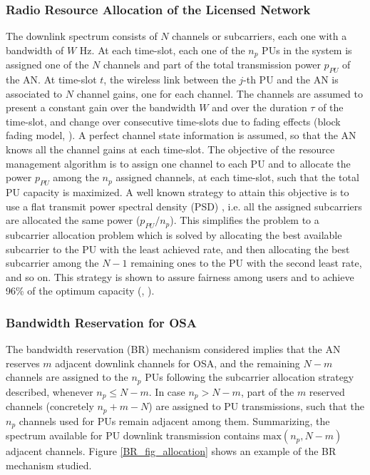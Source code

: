 \subsubsection{Radio Resource Allocation of the Licensed Network} 
The downlink spectrum consists of $N$ channels or subcarriers, each one with a bandwidth of $W$ Hz. At each time-slot, each one of the $n_{p}$ PUs in the system is assigned one of the $N$ channels and part of the total transmission power $p_{PU}$ of the AN.
At time-slot $t$, the wireless link between the $j$-th PU and the AN is associated to $N$ channel gains, one for each channel. The channels are assumed to present a constant gain over the bandwidth $W$ and over the duration $\tau$ of the time-slot, and change over consecutive time-slots due to fading effects (block fading model, \cite{ref:Goldsmith2005}).
A perfect channel state information is assumed, so that the AN knows all the channel gains at each time-slot.
The objective of the resource management algorithm is to assign one channel to each PU and to allocate the power $p_{PU}$ among the $n_{p}$ assigned channels, at each time-slot, such that the total PU capacity is maximized.
A well known strategy to attain this objective is to use a flat transmit power spectral density (PSD) \cite{ref:Rhee2000}, i.e. all the assigned subcarriers are allocated the same power ($p_{PU}/n_{p}$). This simplifies the problem to a subcarrier allocation problem which is solved by allocating the best available subcarrier to the PU with the least achieved rate, and then allocating the best subcarrier among the $N-1$ remaining ones to the PU with the second least rate, and so on. This strategy is shown to assure fairness among users and to achieve 96\% of the optimum capacity (\cite{ref:Rhee2000}, \cite{ref:Sadr2009}).

\subsubsection{Bandwidth Reservation for OSA} 
The bandwidth reservation (BR) mechanism considered implies that the AN reserves $m$ adjacent downlink channels for OSA, and the remaining $N-m$ channels are assigned to the $n_{p}$ PUs following the subcarrier allocation strategy described, whenever $n_{p}\leq N-m$. In case $n_{p}>N-m$, part of the $m$ reserved channels (concretely $n_{p}+m-N$) are assigned to PU transmissions, such that the $n_{p}$ channels used for PUs remain adjacent among them. Summarizing, the spectrum available for PU downlink transmission contains $\text{max}\left(n_{p},N-m\right)$ adjacent channels. Figure \ref{BR_fig_allocation} shows an example of the BR mechanism studied.

